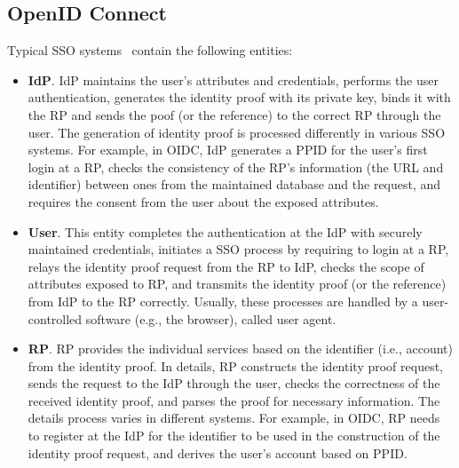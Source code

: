 \subsection{OpenID Connect}
\label{subsec:OIDC}
Typical SSO systems~\cite{SAMLIdentifier,OpenIDConnect,SPRESSO} contain the following entities:
\begin{itemize}
    \item \textbf{IdP}. IdP maintains the user's attributes and credentials, performs the user authentication, generates the identity proof with its private key, binds it with the RP and sends the poof (or the reference) to the correct RP through the user. The generation of identity proof is processed differently in various SSO systems. For example, in OIDC, IdP generates a PPID for the user's first login at a RP, checks the consistency of the RP's information (the URL and identifier) between ones from the maintained database and the request, and requires the  consent from the user about the exposed attributes.
     \item \textbf{User}. This entity completes the authentication at the IdP with securely maintained credentials, initiates a SSO process by requiring to login at a RP, relays the identity proof request from the RP to IdP, checks the scope of attributes exposed to RP, and transmits the identity proof (or the reference) from IdP to the RP correctly. Usually, these processes are handled by  a user-controlled software (e.g., the browser), called user agent.
    \item \textbf{RP}. RP provides the individual services based on the identifier (i.e., account) from the identity proof. In details, RP constructs the identity proof request, sends the request to the IdP through the user, checks the correctness of the received identity proof, and parses the proof for necessary information. The details process varies in different systems. For example, in OIDC, RP needs to register at the IdP for the identifier to be used in the construction of the identity proof request, and derives the user's account based on PPID.
\end{itemize}
